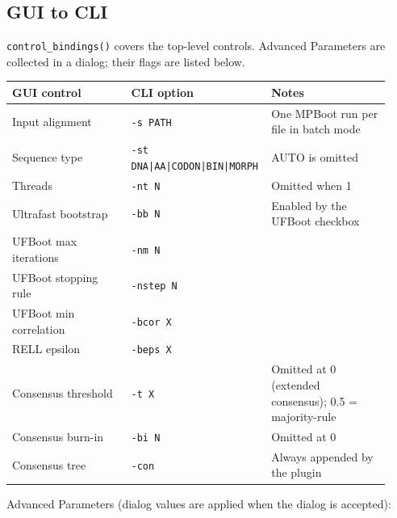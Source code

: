 \documentclass[11pt]{report}
\begin{document}
\subsection{GUI to CLI}

\texttt{control\_\allowbreak bindings\allowbreak ()} covers the top-level controls. Advanced Parameters are collected in a dialog; their flags are listed below.

{\footnotesize
\begin{longtable}{@{}>{\raggedright\arraybackslash}p{0.31\linewidth}>{\raggedright\arraybackslash}p{0.31\linewidth}>{\raggedright\arraybackslash}p{0.31\linewidth}@{}}
\toprule
GUI control & CLI option & Notes \\
\midrule
\endhead
Input alignment & \texttt{-s PATH} & One MPBoot run per file in batch mode \\
Sequence type & \texttt{-st DNA|\allowbreak AA|\allowbreak CODON|\allowbreak BIN|\allowbreak MORPH} & AUTO is omitted \\
Threads & \texttt{-nt N} & Omitted when 1 \\
Ultrafast bootstrap & \texttt{-bb N} & Enabled by the UFBoot checkbox \\
UFBoot max iterations & \texttt{-nm N} &  \\
UFBoot stopping rule & \texttt{-nstep N} &  \\
UFBoot min correlation & \texttt{-bcor X} &  \\
RELL epsilon & \texttt{-beps X} &  \\
Consensus threshold & \texttt{-t X} & Omitted at 0 (extended consensus); 0.5 = majority-rule \\
Consensus burn-in & \texttt{-bi N} & Omitted at 0 \\
Consensus tree & \texttt{-con} & Always appended by the plugin \\
\bottomrule
\end{longtable}
}

Advanced Parameters (dialog values are applied when the dialog is accepted):
\end{document}
